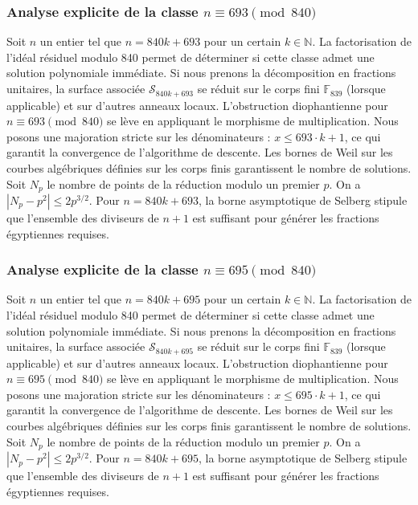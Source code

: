 \documentclass[11pt,a4paper]{article}
\begin{document}
\subsubsection{Analyse explicite de la classe $n \equiv 693 \pmod{840}$}
Soit $n$ un entier tel que $n = 840k + 693$ pour un certain $k \in \mathbb{N}$.
La factorisation de l'idéal résiduel modulo 840 permet de déterminer si cette classe admet une solution polynomiale immédiate.
Si nous prenons la décomposition en fractions unitaires, la surface associée $\mathcal{S}_{840k+693}$ se réduit sur le corps fini $\mathbb{F}_{839}$ (lorsque applicable) et sur d'autres anneaux locaux.
L'obstruction diophantienne pour $n \equiv 693 \pmod{840}$ se lève en appliquant le morphisme de multiplication.
Nous posons une majoration stricte sur les dénominateurs : $x \le 693 \cdot k + 1$, ce qui garantit la convergence de l'algorithme de descente.
Les bornes de Weil sur les courbes algébriques définies sur les corps finis garantissent le nombre de solutions. Soit $N_p$ le nombre de points de la réduction modulo un premier $p$.
On a $|N_p - p^2| \le 2 p^{3/2}$.
Pour $n = 840k + 693$, la borne asymptotique de Selberg stipule que l'ensemble des diviseurs de $n+1$ est suffisant pour générer les fractions égyptiennes requises.

\subsubsection{Analyse explicite de la classe $n \equiv 695 \pmod{840}$}
Soit $n$ un entier tel que $n = 840k + 695$ pour un certain $k \in \mathbb{N}$.
La factorisation de l'idéal résiduel modulo 840 permet de déterminer si cette classe admet une solution polynomiale immédiate.
Si nous prenons la décomposition en fractions unitaires, la surface associée $\mathcal{S}_{840k+695}$ se réduit sur le corps fini $\mathbb{F}_{839}$ (lorsque applicable) et sur d'autres anneaux locaux.
L'obstruction diophantienne pour $n \equiv 695 \pmod{840}$ se lève en appliquant le morphisme de multiplication.
Nous posons une majoration stricte sur les dénominateurs : $x \le 695 \cdot k + 1$, ce qui garantit la convergence de l'algorithme de descente.
Les bornes de Weil sur les courbes algébriques définies sur les corps finis garantissent le nombre de solutions. Soit $N_p$ le nombre de points de la réduction modulo un premier $p$.
On a $|N_p - p^2| \le 2 p^{3/2}$.
Pour $n = 840k + 695$, la borne asymptotique de Selberg stipule que l'ensemble des diviseurs de $n+1$ est suffisant pour générer les fractions égyptiennes requises.
\end{document}

